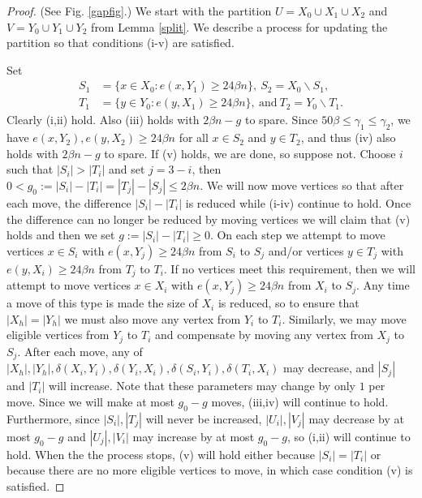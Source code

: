\documentclass[oneside,12pt]{memoir}
\begin{document}
\begin{proof} (See Fig. \ref{gapfig}.) We start with the partition $U=X_{0}\cup X_{1}\cup X_{2}$
and $V=Y_{0}\cup Y_{1}\cup Y_{2}$ from Lemma \ref{split}. We describe a process for updating the partition so that conditions (i-v) are satisfied. 

Set
\begin{align*}
S_{1}&=\{x\in X_{0}:e(x,Y_{1})\geq 24\beta n\},~ S_{2}=X_{0}\smallsetminus S_{1},\\
T_{1}&=\{y\in Y_{0}:e(y,X_{1})\geq24\beta n\}, ~\text{and}~ T_{2}=Y_{0}\smallsetminus T_{1}.
\end{align*}
Clearly (i,ii) hold. Also (iii) holds with $2\beta n-g$ to spare. Since $50\beta\leq\gamma_{1}\leq\gamma_{2}$, we have $e(x,Y_{2}), e(y,X_{2})\geq24\beta n$ for all $x\in S_{2}$
and $y\in T_{2}$, and thus (iv) also holds with $2\beta n-g$ to spare. If (v) holds, we are done, so suppose not. Choose $i$ such that $|S_{i}|>|T_{i}|$ and set $j=3-i$, then $0<g_{0}:=|S_{i}|-|T_{i}|= |T_{j}|-|S_{j}| \le  2\beta n$.  We will now move vertices so that after each move, the difference $|S_i|-|T_i|$ is reduced while (i-iv) continue to hold.  Once the difference can no longer be reduced by moving vertices we will claim that (v) holds and then we set $g:=|S_i|-|T_i|\geq 0$. On each step we attempt to move vertices $x\in S_{i}$ with $e(x,Y_{j})\geq24\beta n$ from $S_{i}$ to $S_{j}$ and/or vertices $y\in T_{j}$ with $e(y,X_{i})\geq24\beta n$ from $T_{j}$ to $T_{i}$. If no vertices meet this requirement, then we will attempt to move vertices $x\in X_{i}$ with $e(x,Y_{j})\geq24\beta n$ from $X_{i}$ to $S_{j}$. Any time a move of this type is made the size of $X_{i}$ is reduced, so to ensure that $|X_h|=|Y_h|$ we must also move any vertex from $Y_{i}$ to $T_{i}$. Similarly, we may move eligible vertices from $Y_{j}$ to $T_{i}$ and compensate by moving any vertex from $X_{j}$ to $S_{j}$. After each move, any of $|X_{h}|,|Y_{h}|,\delta(X_{i}, Y_{i}),\delta(Y_{i}, X_{i}), \delta(S_{i},Y_{i}),\delta(T_{i},X_{i})$ may decrease, and $|S_{j}|$ and $|T_{i}|$ will increase. Note that these parameters may change by only $1$ per move. Since we will make at most $g_{0}-g$ moves, (iii,iv) will continue to hold. Furthermore, since $|S_i|,|T_j|$ will never be increased, $|U_i|, |V_j|$ may decrease by at most $g_0-g$ and $|U_j|, |V_i|$ may increase by at most $g_0-g$, so (i,ii) will continue to hold. When the the process stops, (v) will hold either because $|S_{i}|=|T_{i}|$ or because there are no more eligible vertices to move, in which case condition (v) is satisfied.

\end{proof}
\end{document}
